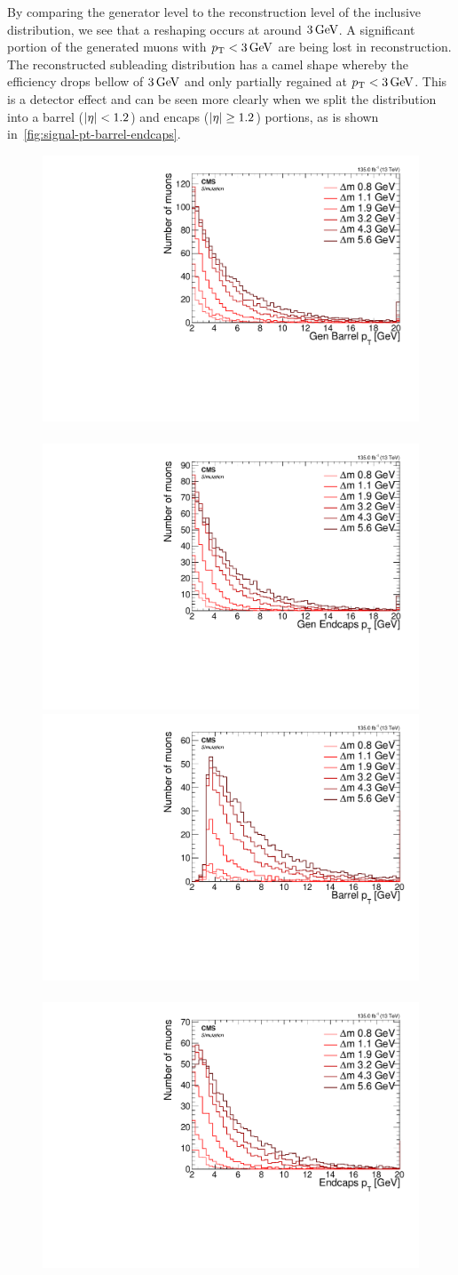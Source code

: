 By comparing the generator level to the reconstruction level of the inclusive \pt distribution, we see that a reshaping occurs at around $3 \,\text{Ge\hspace{-.08em}V}$. A significant portion of the generated muons with $p_{\mathrm{T}}<3\,\text{Ge\hspace{-.08em}V}$ are being lost in reconstruction. The reconstructed subleading \pt distribution has a camel shape whereby the efficiency drops bellow \pt of $3\,\text{Ge\hspace{-.08em}V}$ and only partially regained at $p_{\mathrm{T}}<3\,\text{Ge\hspace{-.08em}V}$. This is a detector effect and can be seen more clearly when we split the \pt distribution into a barrel ($\lvert \eta \rvert < 1.2$) and encaps ($\lvert \eta \rvert \geq 1.2$) portions, as is shown in~\ref{fig:signal-pt-barrel-endcaps}.

\begin{figure}[!htb]
\centering
\includegraphics[width=0.48\linewidth]{plots/signal_muons_gen/none_Muons_pt_barrel.pdf} \,
\includegraphics[width=0.48\linewidth]{plots/signal_muons_gen/none_Muons_pt_endcape.pdf}  \\
\includegraphics[width=0.48\linewidth]{plots/signal_muons/none_Muons_pt_barrel.pdf} \,
\includegraphics[width=0.48\linewidth]{plots/signal_muons/none_Muons_pt_endcape.pdf}  \\

\end{figure}
